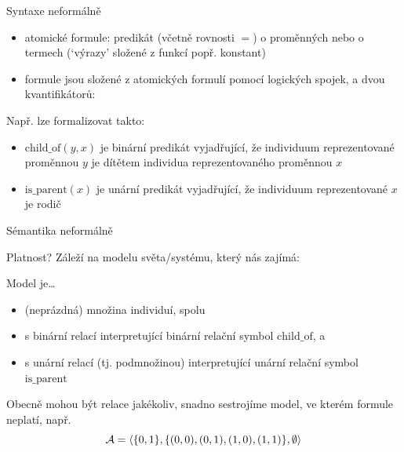 \documentclass{beamer}
\begin{document}
\begin{frame}{Syntaxe neformálně}

    \begin{itemize}
        \item \alert{atomické formule}: predikát (včetně \alert{rovnosti} $=$) o proměnných nebo o \alert{termech} (`výrazy' složené z funkcí popř. konstant)\pause
        \item \alert{formule} jsou složené z atomických formulí pomocí logických spojek, a dvou \alert{kvantifikátorů}:\pause
    \end{itemize}  

    \medskip

    \bigskip

    Např.  lze formalizovat takto:
    \pause

    \begin{itemize}
        \item \alert{$\mathrm{child\_of}(y,x)$} je binární predikát vyjadřující, že individuum reprezentované proměnnou $y$ je dítětem individua reprezentovaného proměnnou $x$\pause
        \item \alert{$\mathrm{is\_parent}(x)$} je unární predikát vyjadřující, že individuum reprezentované $x$ je rodič
    \end{itemize}
    
\end{frame}


\begin{frame}{Sémantika neformálně}

    \pause

    Platnost? Záleží na \alert{modelu} světa/systému, který nás zajímá:\pause
    
    \alert{Model} je\dots\pause
    \begin{itemize}
        \item (neprázdná) množina individuí, spolu\pause
        \item s binární relací \alert{interpretující} binární relační symbol \alert{$\mathrm{child\_of}$}, a\pause
        \item s unární relací (tj. podmnožinou) interpretující unární relační symbol \alert{$\mathrm{is\_parent}$}\pause        
    \end{itemize}
    Obecně mohou být relace jakékoliv, snadno sestrojíme model, ve kterém formule neplatí, např. \pause
    $$
    \mathcal{A}=\langle\{0,1\},\{(0,0),(0,1),(1,0),(1,1)\},\emptyset\rangle
    $$

\end{frame}
\end{document}
